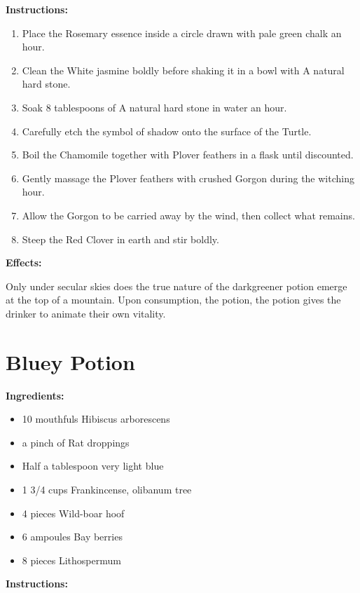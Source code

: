 \documentclass{article}
\begin{document}
\textbf{Instructions:}

\begin{enumerate}
  \item Place the Rosemary essence inside a circle drawn with pale green chalk an hour.
  \item Clean the White jasmine boldly before shaking it in a bowl with A natural hard stone.
  \item Soak 8 tablespoons of A natural hard stone in water an hour.
  \item Carefully etch the symbol of shadow onto the surface of the Turtle.
  \item Boil the Chamomile together with Plover feathers in a flask until discounted.
  \item Gently massage the Plover feathers with crushed Gorgon during the witching hour.
  \item Allow the Gorgon to be carried away by the wind, then collect what remains.
  \item Steep the Red Clover in earth and stir boldly.
\end{enumerate}

\textbf{Effects:}

Only under secular skies does the true nature of the darkgreener potion emerge at the top of a mountain. Upon consumption, the potion, the potion gives the drinker to animate their own vitality.

\newpage
\section*{Bluey Potion}

\textbf{Ingredients:}

\begin{itemize}
  \item 10 mouthfuls Hibiscus arborescens
  \item a pinch of Rat droppings
  \item Half a tablespoon very light blue
  \item 1 3/4 cups Frankincense, olibanum tree
  \item 4 pieces Wild-boar hoof
  \item 6 ampoules Bay berries
  \item 8 pieces Lithospermum
\end{itemize}

\textbf{Instructions:}
\end{document}
